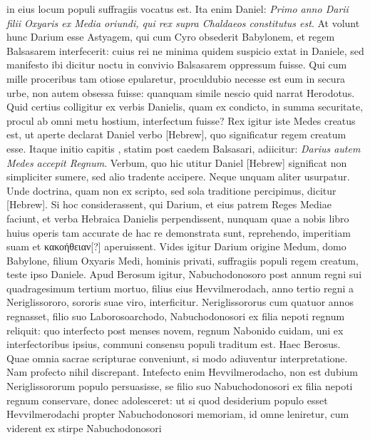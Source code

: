 in eius locum populi suffragiis vocatus est.
Ita enim Daniel: \textit{Primo
anno Darii filii Oxyaris ex Media oriundi, qui rex supra Chaldaeos
constitutus est}.
At volunt hunc Darium esse Astyagem, qui cum
Cyro obsederit Babylonem, et regem Balsasarem interfecerit: cuius
rei ne minima quidem suspicio extat in Daniele, sed manifesto
ibi dicitur noctu in convivio Balsasarem oppressum fuisse.
Qui
cum mille proceribus tam otiose epularetur, proculdubio necesse
est eum in secura urbe, non autem obsessa fuisse: quanquam simile
nescio quid narrat Herodotus.
Quid certius colligitur ex verbis
Danielis, quam ex condicto, in summa securitate, procul ab omni
metu hostium, interfectum fuisse?
Rex igitur iste Medes creatus
est, ut aperte declarat Daniel verbo
 \texthebrew{}[Hebrew], quo significatur regem
creatum esse.
Itaque initio capitis , statim post caedem Balsasari,
adiicitur: \textit{Darius autem Medes accepit Regnum}.
Verbum,
quo hic utitur Daniel \texthebrew{}[Hebrew]
 significat non simpliciter sumere, sed
alio tradente accipere.
Neque unquam aliter usurpatur.
Unde doctrina,
quam non ex scripto, sed sola traditione percipimus, dicitur
\texthebrew{}[Hebrew].
Si hoc considerassent, qui Darium, et eius patrem Reges
Mediae faciunt, et verba Hebraica Danielis perpendissent,
nunquam quae a nobis libro  huius operis tam accurate de hac
re demonstrata sunt, reprehendo, imperitiam suam et \textgreek{κακοήθειαν[?]}
aperuissent.
Vides igitur Darium origine Medum, domo Babylone,
filium Oxyaris Medi, hominis privati, suffragiis populi regem
creatum, teste ipso Daniele.
Apud Berosum igitur, Nabuchodonosoro
post annum regni sui quadragesimum tertium mortuo, filius
eius Hevvilmerodach, anno tertio regni a Neriglissororo, sororis
suae viro, interficitur.
%
Neriglissororus cum quatuor annos regnasset,
filio suo Laborosoarchodo, Nabuchodonosori ex filia nepoti
regnum reliquit: quo interfecto post menses novem, regnum Nabonido
cuidam, uni ex interfectoribus ipsius, communi consensu
populi traditum est.
Haec Berosus.
Quae omnia sacrae scripturae conveniunt,
si modo adiuventur interpretatione.
Nam profecto nihil
discrepant.
Intefecto enim Hevvilmerodacho, non est dubium
Neriglissororum populo persuasisse, se filio suo Nabuchodonosori
ex filia nepoti regnum conservare, donec adolesceret: ut si quod
desiderium populo esset Hevvilmerodachi propter Nabuchodonosori
memoriam, id omne leniretur, cum viderent ex stirpe Nabuchodonosori
